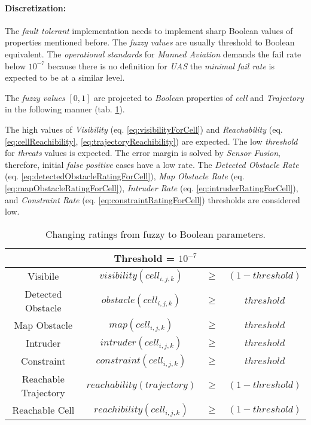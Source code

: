 \paragraph{Discretization:} The \emph{fault tolerant} implementation needs to implement sharp Boolean values of properties mentioned before. The \emph{fuzzy values} are usually threshold to Boolean equivalent. The \emph{operational standards} for \emph{Manned Aviation} \cite{icao4444} demands the fail rate below $10^{-7}$ because there is no definition for \emph{UAS} the \emph{minimal fail rate} is expected to be at a similar level.

The \emph{fuzzy values} $[0,1]$ are projected to \emph{Boolean} properties of \emph{cell} and \emph{Trajectory} in the following manner (tab. \ref{tab:defuzificationRatings}).


The high values of \emph{Visibility} (eq. \ref{eq:visibilityForCell}) and \emph{Reachability} (eq. \ref{eq:cellReachibility}, \ref{eq:trajectoryReachibility}) are expected. The low \emph{threshold} for \emph{threats} values is expected. The error margin is solved by \emph{Sensor Fusion}, therefore, initial \emph{false positive} cases have a low rate. The \emph{Detected Obstacle Rate} (eq. \ref{eq:detectedObstacleRatingForCell}), \emph{Map Obstacle Rate} (eq. \ref{eq:mapObstacleRatingForCell}), \emph{Intruder Rate} (eq. \ref{eq:intruderRatingForCell}), and \emph{Constraint Rate} (eq. \ref{eq:constraintRatingForCell}) thresholds are considered low.

\begin{table}[H]
    \centering
    \begin{tabular}{c|ccc}
        \multicolumn{4}{c}{Threshold = $10^{-7}$}\\\hline\hline
        Visibile & $visibility(cell_{i,j,k})$&$\ge$&$(1-threshold)$ \\\hline
        Detected Obstacle &  $obstacle(cell_{i,j,k}) $&$ \ge $&$ threshold$\\\hline
        Map Obstacle &  $map(cell_{i,j,k})$&$\ge$&$threshold$\\\hline
        Intruder &  $intruder(cell_{i,j,k})$&$\ge$&$threshold$\\\hline
        Constraint &  $constraint(cell_{i,j,k})$&$\ge$&$threshold$\\\hline\hline
        Reachable Trajectory &  $reachability(trajectory)$&$\ge$&$(1-threshold)$\\\hline
        Reachable Cell &  $reachibility(cell_{i,j,k})$&$\ge$&$(1-threshold)$
    \end{tabular}
    \caption{Changing ratings from fuzzy to Boolean parameters.}
    \label{tab:defuzificationRatings}
\end{table}


